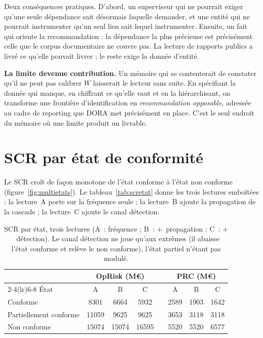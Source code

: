 Deux conséquences pratiques. D'abord, un superviseur qui ne pourrait exiger qu'une seule
dépendance sait désormais laquelle demander, et une entité qui ne pourrait instrumenter qu'un seul
lien sait lequel instrumenter. Ensuite, un fait qui oriente la recommandation : la
dépendance la plus précieuse est précisément celle que le corpus documentaire ne couvre pas. La
lecture de rapports publics a livré ce qu'elle pouvait livrer ; le reste exige la donnée d'entité.


\begin{cle}
\textbf{La limite devenue contribution.} Un mémoire qui se contenterait de constater qu'il ne
peut pas calibrer $W$ laisserait le lecteur sans suite. En spécifiant la donnée qui manque, en
chiffrant ce qu'elle vaut et en la hiérarchisant, on transforme une frontière d'identification en
\emph{recommandation opposable}, adressée au cadre de reporting que DORA met précisément en
place. C'est le seul endroit du mémoire où une limite produit un livrable.
\end{cle}


\section{SCR par état de conformité}

Le SCR croît de façon monotone de l'état conforme à l'état non conforme
(figure~\ref{fig:multietats}). Le tableau~\ref{tab:scretat} donne les trois lectures emboîtées :
la lecture~A porte sur la fréquence seule ; la lecture~B ajoute la
propagation de la cascade ; la lecture~C ajoute le canal détection.

\begin{table}[htbp]\centering\small
\renewcommand{\arraystretch}{1.25}
\begin{tabular}{@{}l ccc c ccc@{}}
\toprule
& \multicolumn{3}{c}{\textbf{OpRisk} (M\euro)} & & \multicolumn{3}{c}{\textbf{PRC} (M\euro)} \\
\cmidrule(lr){2-4}\cmidrule(lr){6-8}
État & A & B & C & & A & B & C \\
\midrule
Conforme               & 8301  & 6664  & 5932  & & 2589 & 1903 & 1642 \\
Partiellement conforme & 11059 & 9625  & 9625  & & 3653 & 3118 & 3118 \\
Non conforme           & 15074 & 15074 & 16595 & & 5520 & 5520 & 6577 \\
\bottomrule
\end{tabular}
\caption{SCR par état, trois lectures (A~: fréquence ; B~: $+$~propagation ; C~:
$+$~détection). Le canal détection ne joue qu'aux extrêmes (il
abaisse l'état conforme et relève le non conforme), l'état partiel n'étant pas modulé.}
\end{table}

